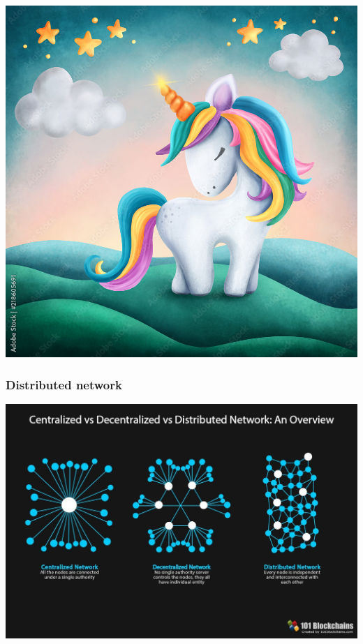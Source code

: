 \documentclass[11pt]{beamer}  %
\begin{document}
\begin{frame}
  \begin{center}
    \includegraphics[scale=0.3,clip=false]{pictures/unicorn.jpg}
  \end{center}

\end{frame}

\begin{frame}\frametitle{Distributed network}

  \begin{center}
    \includegraphics[scale=0.22,clip=false]{pictures/distributed.jpg}
  \end{center}

\end{frame}
\end{document}
